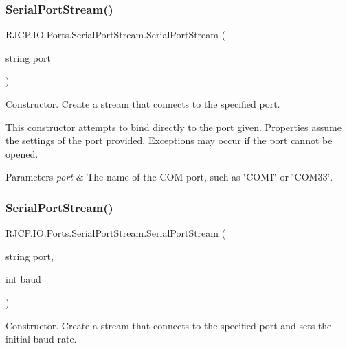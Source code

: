 \subsubsection{\texorpdfstring{SerialPortStream()}{SerialPortStream()}\hspace{0.1cm}{\footnotesize\ttfamily [2/4]}}
{\footnotesize\ttfamily R\+J\+C\+P.\+I\+O.\+Ports.\+Serial\+Port\+Stream.\+Serial\+Port\+Stream (\begin{DoxyParamCaption}\item[{string}]{port }\end{DoxyParamCaption})}



Constructor. Create a stream that connects to the specified port. 

This constructor attempts to bind directly to the port given. Properties assume the settings of the port provided. Exceptions may occur if the port cannot be opened. 


\begin{DoxyParams}{Parameters}
{\em port} & The name of the C\+OM port, such as \char`\"{}\+C\+O\+M1\char`\"{} or \char`\"{}\+C\+O\+M33\char`\"{}.\\
\hline
\end{DoxyParams}
\mbox{\label{class_r_j_c_p_1_1_i_o_1_1_ports_1_1_serial_port_stream_a099de0b3186770e7b217a0627bf9a7a4}} 
\subsubsection{\texorpdfstring{SerialPortStream()}{SerialPortStream()}\hspace{0.1cm}{\footnotesize\ttfamily [3/4]}}
{\footnotesize\ttfamily R\+J\+C\+P.\+I\+O.\+Ports.\+Serial\+Port\+Stream.\+Serial\+Port\+Stream (\begin{DoxyParamCaption}\item[{string}]{port,  }\item[{int}]{baud }\end{DoxyParamCaption})}



Constructor. Create a stream that connects to the specified port and sets the initial baud rate. 

